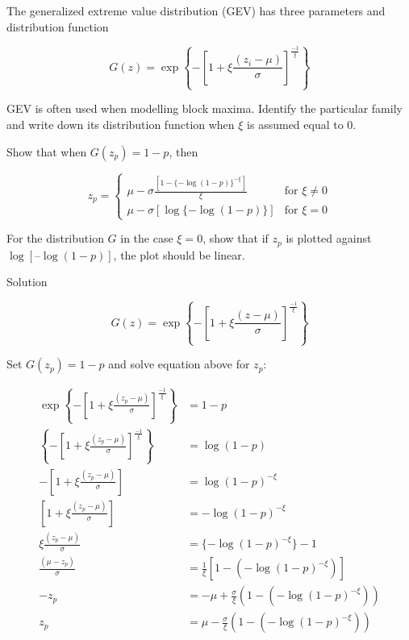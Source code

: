 \documentclass[
  letterpaper,
  DIV=11,
  numbers=noendperiod,
  oneside]{scrartcl}
\begin{document}
\begin{tcolorbox}[enhanced jigsaw, colframe=quarto-callout-warning-color-frame, toptitle=1mm, toprule=.15mm, bottomtitle=1mm, titlerule=0mm, coltitle=black, left=2mm, rightrule=.15mm, arc=.35mm, colback=white, title={Task 11}, breakable, opacitybacktitle=0.6, opacityback=0, bottomrule=.15mm, leftrule=.75mm, colbacktitle=quarto-callout-warning-color!10!white]

The generalized extreme value distribution (GEV) has three parameters
and distribution function

\[G(z) = \exp \left\{ -\left[ 1+\xi\frac{(z_i - \mu)}{\sigma}\right]^{\frac{-1}{\xi}}\right\}\]

GEV is often used when modelling block maxima. Identify the particular
family and write down its distribution function when \(\xi\) is assumed
equal to 0.

Show that when \(G(z_p) =1-p\), then

\[z_p = \begin{cases} \mu - \sigma \frac{[1-\{-\log(1-p)\}^{-\xi}]}{\xi} & \text{for } \xi \neq 0\\ 
\mu - \sigma[\log\{-\log(1-p)\}] & \text{for } \xi = 0\end{cases}\]

For the distribution \(G\) in the case \(\xi=0\), show that if \(z_p\)
is plotted against \(\log[–\log(1-p)]\), the plot should be linear.

Solution

\[G(z) = \exp \left\{ -\left[ 1+\xi\frac{(z - \mu)}{\sigma}\right]^{\frac{-1}{\xi}}\right\}\]

Set \(G(z_p) = 1 - p\) and solve equation above for \(z_p\):

\[\begin{split} \exp \left\{ -\left[ 1+\xi\frac{(z_p - \mu)}{\sigma}\right]^{\frac{-1}{\xi}}\right\} &= 1 - p\\
\left\{ -\left[ 1+\xi\frac{(z_p - \mu)}{\sigma}\right]^{\frac{-1}{\xi}}\right\} &= \log(1-p)\\
-\left[ 1+\xi\frac{(z_p - \mu)}{\sigma}\right] &= \log(1-p)^{-\xi}\\
\left[ 1+\xi\frac{(z_p - \mu)}{\sigma}\right] &= -\log(1-p)^{-\xi}\\
\xi\frac{(z_p - \mu)}{\sigma} &= \{ -\log(1-p)^{-\xi}\}-1\\
\frac{(\mu - z_p)}{\sigma} &= \frac{1}{\xi}[1-(-\log(1-p)^{-\xi})]\\
-z_p &= -\mu + \frac{\sigma}{\xi}(1-(-\log(1-p)^{-\xi}))\\z_p &= \mu - \frac{\sigma}{\xi}(1-(-\log(1-p)^{-\xi}))\end{split}\]


\end{tcolorbox}
\end{document}
